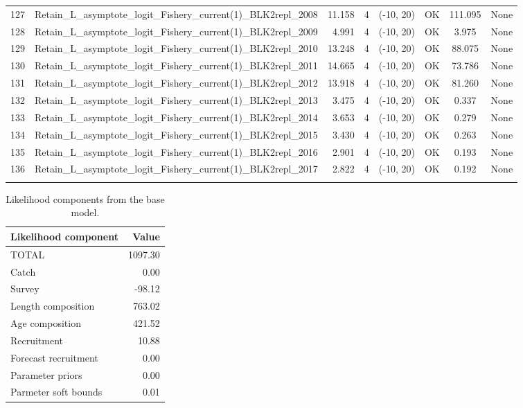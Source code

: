 \documentclass[12pt,]{article}
\begin{document}
\begin{landscape}
\begin{longtable}{rlrrcccl}
  127 & Retain\_L\_asymptote\_logit\_Fishery\_current(1)\_BLK2repl\_2008 & 11.158 & 4 & (-10, 20) & OK & 111.095 & None \\ 
  128 & Retain\_L\_asymptote\_logit\_Fishery\_current(1)\_BLK2repl\_2009 & 4.991 & 4 & (-10, 20) & OK & 3.975 & None \\ 
  129 & Retain\_L\_asymptote\_logit\_Fishery\_current(1)\_BLK2repl\_2010 & 13.248 & 4 & (-10, 20) & OK & 88.075 & None \\ 
  130 & Retain\_L\_asymptote\_logit\_Fishery\_current(1)\_BLK2repl\_2011 & 14.665 & 4 & (-10, 20) & OK & 73.786 & None \\ 
  131 & Retain\_L\_asymptote\_logit\_Fishery\_current(1)\_BLK2repl\_2012 & 13.918 & 4 & (-10, 20) & OK & 81.260 & None \\ 
  132 & Retain\_L\_asymptote\_logit\_Fishery\_current(1)\_BLK2repl\_2013 & 3.475 & 4 & (-10, 20) & OK & 0.337 & None \\ 
  133 & Retain\_L\_asymptote\_logit\_Fishery\_current(1)\_BLK2repl\_2014 & 3.653 & 4 & (-10, 20) & OK & 0.279 & None \\ 
  134 & Retain\_L\_asymptote\_logit\_Fishery\_current(1)\_BLK2repl\_2015 & 3.430 & 4 & (-10, 20) & OK & 0.263 & None \\ 
  135 & Retain\_L\_asymptote\_logit\_Fishery\_current(1)\_BLK2repl\_2016 & 2.901 & 4 & (-10, 20) & OK & 0.193 & None \\ 
  136 & Retain\_L\_asymptote\_logit\_Fishery\_current(1)\_BLK2repl\_2017 & 2.822 & 4 & (-10, 20) & OK & 0.192 & None \\ 
   \hline
\hline
\label{tab:model_params}
\end{longtable}
\end{landscape}

\FloatBarrier

\begin{table}[ht]
\centering
\caption{Likelihood components from the base model.} 
\label{tab:like_components}
\begin{tabular}{lr}
  \hline
Likelihood component & Value \\ 
  \hline
TOTAL & 1097.30 \\ 
  Catch & 0.00 \\ 
  Survey & -98.12 \\ 
  Length composition & 763.02 \\ 
  Age composition & 421.52 \\ 
  Recruitment & 10.88 \\ 
  Forecast recruitment & 0.00 \\ 
  Parameter priors & 0.00 \\ 
  Parmeter soft bounds & 0.01 \\ 
   \hline
\end{tabular}
\end{table}
\end{document}
